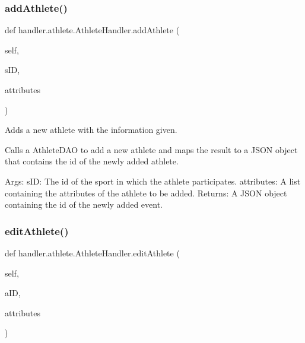 \subsubsection{\texorpdfstring{add\+Athlete()}{addAthlete()}}
{\footnotesize\ttfamily def handler.\+athlete.\+Athlete\+Handler.\+add\+Athlete (\begin{DoxyParamCaption}\item[{}]{self,  }\item[{}]{s\+ID,  }\item[{}]{attributes }\end{DoxyParamCaption})}

\begin{DoxyVerb}Adds a new athlete with the information given.

Calls a AthleteDAO to add a new athlete and maps the 
result to a JSON object that contains the id of the newly added 
athlete.

Args:
    sID: The id of the sport in which the athlete participates.
    attributes: A list containing the attributes of the athlete to
        be added.
Returns:
    A JSON object containing the id of the newly added event.\end{DoxyVerb}
 \mbox{\label{classhandler_1_1athlete_1_1_athlete_handler_af2953ad06fe27a2bd718a83cde63272b}} 
\subsubsection{\texorpdfstring{edit\+Athlete()}{editAthlete()}}
{\footnotesize\ttfamily def handler.\+athlete.\+Athlete\+Handler.\+edit\+Athlete (\begin{DoxyParamCaption}\item[{}]{self,  }\item[{}]{a\+ID,  }\item[{}]{attributes }\end{DoxyParamCaption})}

